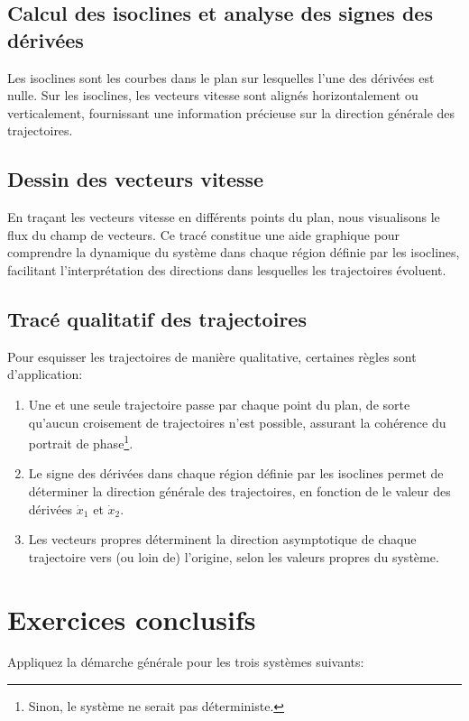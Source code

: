        \subsection{Calcul des isoclines et analyse des signes des dérivées}
            Les isoclines sont les courbes dans le plan sur lesquelles l'une des dérivées est nulle. Sur les isoclines, les vecteurs vitesse sont alignés horizontalement ou verticalement, fournissant une information précieuse sur la direction générale des trajectoires.

        \subsection{Dessin des vecteurs vitesse}
            En traçant les vecteurs vitesse en différents points du plan, nous visualisons le flux du champ de vecteurs. Ce tracé constitue une aide graphique pour comprendre la dynamique du système dans chaque région définie par les isoclines, facilitant l’interprétation des directions dans lesquelles les trajectoires évoluent.

        \subsection{Tracé qualitatif des trajectoires}
        Pour esquisser les trajectoires de manière qualitative, certaines règles sont d'application:
        \begin{enumerate}
            \item Une et une seule trajectoire passe par chaque point du plan, de sorte qu'aucun croisement de trajectoires n'est possible, assurant la cohérence du portrait de phase\footnote{Sinon, le système ne serait pas déterministe.}.
            \item Le signe des dérivées dans chaque région définie par les isoclines permet de déterminer la direction générale des trajectoires, en fonction de le valeur des dérivées $\dot{x}_1$ et $\dot{x}_2$.
            \item Les vecteurs propres déterminent la direction asymptotique de chaque trajectoire vers (ou loin de) l'origine, selon les valeurs propres du système.
        \end{enumerate}

    \section{Exercices conclusifs}
        Appliquez la démarche générale pour les trois systèmes suivants:

